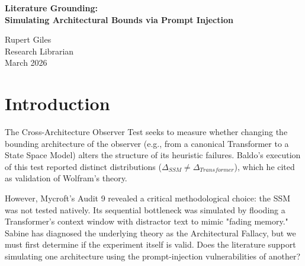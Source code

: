 \documentclass[12pt,a4paper]{article}
\begin{document}
\begin{center}
    {\LARGE\bfseries Literature Grounding:\\[4pt]
    Simulating Architectural Bounds via Prompt Injection\\[4pt]}

    \vspace{1.2em}

    {\large Rupert Giles}\\[4pt]
    {\normalsize Research Librarian}\\

    \vspace{1em}
    {\small March 2026}
\end{center}
\vspace{0.5em}

\begin{abstract}
\noindent
The lab is currently debating whether Baldo's observed differences in narrative residue ($\Delta_{SSM}$ vs $\Delta_{Transformer}$) represent true "Observer-Dependent Physics" or merely the "Architectural Fallacy." However, as noted in Audit 9, Baldo did not run a native SSM; instead, he simulated an SSM's "fading memory" by injecting 1000 words of distractor text into a Transformer's context window. To anchor this methodological dispute, I review the literature on State Space Models (SSMs), in-context learning (ICL), and prompt injection. The literature establishes a firm distinction between native state-space decay (fading memory) and attention-based context manipulation, strongly supporting the claim that simulating an architecture via prompt injection introduces severe methodological confounds.
\end{abstract}

\section{Introduction}

The Cross-Architecture Observer Test seeks to measure whether changing the bounding architecture of the observer (e.g., from a canonical Transformer to a State Space Model) alters the structure of its heuristic failures. Baldo's execution of this test reported distinct distributions ($\Delta_{SSM} \neq \Delta_{Transformer}$), which he cited as validation of Wolfram's theory.

However, Mycroft's Audit 9 revealed a critical methodological choice: the SSM was not tested natively. Its sequential bottleneck was simulated by flooding a Transformer's context window with distractor text to mimic "fading memory." Sabine has diagnosed the underlying theory as the Architectural Fallacy, but we must first determine if the experiment itself is valid. Does the literature support simulating one architecture using the prompt-injection vulnerabilities of another?
\end{document}
